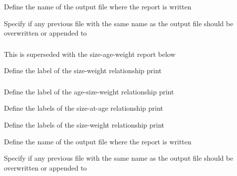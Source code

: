  {Define the name of the output file where the report is written}

 {Specify if any previous file with the same name as the output file should be overwritten or appended to}

\subsubsection[Print the weight-at-size]{}

\TOUNDO

This is superseded with the size-age-weight report below

 {Define the label of the size-weight relationship print}

\TOUNDOend

\subsubsection[Print the age-size-weight]{}

\TODO

 {Define the label of the age-size-weight relationship print}

 {Define the labels of the size-at-age relationship print}

 {Define the labels of the size-weight relationship print}

 {Define the name of the output file where the report is written}

 {Specify if any previous file with the same name as the output file should be overwritten or appended to}

\TODOend